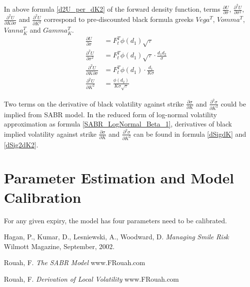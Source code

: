 \documentclass{article}
\begin{document}
In above formula \ref{d2U_per_dK2} of the forward density function, terms $ \frac{\partial U}{\partial \sigma} $, $ \frac{\partial^2 U}{\partial \sigma^2} $, $ \frac{\partial^2 U}{\partial K \partial \sigma} $ and $ \frac{\partial^2 U}{\partial K^2} $ correspond to pre-discounted black formula greeks $ Vega^T $, $ Vomma^T $, $ Vanna_{K}^T $ and $ Gamma_{K}^T $.
\begin{subequations}
    \begin{align}
        \frac{\partial U}{\partial \sigma} &= F_{t}^{T} \phi(d_1) \sqrt{\tau} \\
        \frac{\partial^2 U}{\partial \sigma^2} &= F_{t}^{T} \phi(d_1) \sqrt{\tau} \cdot \frac{d_1 d_2}{\sigma} \\
        \frac{\partial^2 U}{\partial K \partial \sigma} &= F_{t}^{T} \phi(d_1) \cdot \frac{d_1}{K \sigma} \\
        \frac{\partial^2 U}{\partial K^2} &= \frac{\phi(d_2)}{K \sigma \sqrt{\tau}}
    \end{align}
\end{subequations}

Two terms on the derivative of black volatility against strike $ \frac{\partial \sigma}{\partial K} $ and $ \frac{\partial^2 \sigma}{\partial K^2} $ could be implied from SABR model.
In the reduced form of log-normal volatility approximation as formula \ref{SABR_LogNormal_Beta_1}, derivatives of black implied volatility against strike $ \frac{\partial \sigma}{\partial K} $ and $ \frac{\partial^2 \sigma}{\partial K^2} $ can be found in formula \ref{dSigdK} and \ref{dSig2dK2}.


\section{Parameter Estimation and Model Calibration}

For any given expiry, the model has four parameters need to be calibrated.


\begin{thebibliography}{9}
    Hagan, P., Kumar, D., Lesniewski, A., Woodward, D.
    \textit{Managing Smile Risk}
    Wilmott Magazine, September, 2002.
    
    Rouah, F.
    \textit{The SABR Model}
    www.FRouah.com
    
    Rouah, F.
    \textit{Derivation of Local Volatility}
    www.FRouah.com
\end{thebibliography}
\end{document}
